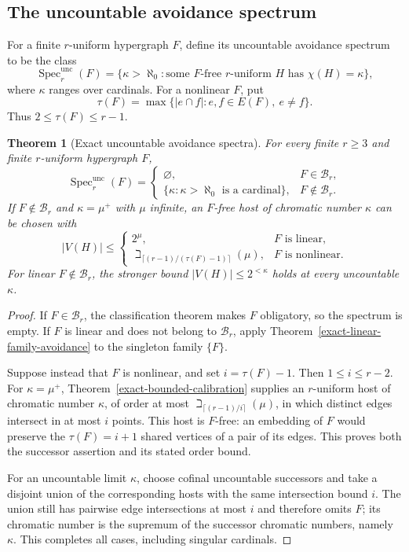 \documentclass[a4paper,11pt,reqno]{amsart}
\theoremstyle{plain}
\newtheorem{theorem}{Theorem}[section]
\theoremstyle{definition}
\theoremstyle{remark}
\begin{document}
\subsection{The uncountable avoidance spectrum}
\label{exact-spectrum-subsection}

For a finite $r$-uniform hypergraph $F$, define its uncountable
avoidance spectrum to be the class
\[
 \operatorname{Spec}^{\mathrm{unc}}_r(F)=
 \{\kappa>\aleph_0:
      \text{some $F$-free $r$-uniform $H$ has $\chi(H)=\kappa$}\},
\]
where $\kappa$ ranges over cardinals.
For a nonlinear $F$, put
\[
 \tau(F)=\max\{|e\cap f|:e,f\in E(F),\ e\ne f\}.
\]
Thus $2\le\tau(F)\le r-1$.

\begin{theorem}[Exact uncountable avoidance spectra]
\label{exact-avoidance-spectrum}
For every finite $r\ge3$ and finite $r$-uniform hypergraph $F$,
\[
 \operatorname{Spec}^{\mathrm{unc}}_r(F)=
 \begin{cases}
  \varnothing,&F\in\mathcal B_r,\\[2pt]
  \{\kappa:\kappa>\aleph_0\text{ is a cardinal}\},
       &F\notin\mathcal B_r.
 \end{cases}
\]
If $F\notin\mathcal B_r$ and $\kappa=\mu^+$ with $\mu$ infinite,
an $F$-free host of chromatic number $\kappa$ can be chosen with
\[
 |V(H)|\le
 \begin{cases}
  2^\mu,&F\text{ is linear},\\[2pt]
  \beth_{\lceil(r-1)/(\tau(F)-1)\rceil}(\mu),
       &F\text{ is nonlinear}.
 \end{cases}
\]
For linear $F\notin\mathcal B_r$, the stronger bound
$|V(H)|\le2^{<\kappa}$ holds at every uncountable $\kappa$.
\end{theorem}

\begin{proof}
If $F\in\mathcal B_r$, the classification theorem makes $F$
obligatory, so the spectrum is empty.
If $F$ is linear and does not belong to $\mathcal B_r$, apply
Theorem~\ref{exact-linear-family-avoidance} to the singleton family
$\{F\}$.

Suppose instead that $F$ is nonlinear, and set $i=\tau(F)-1$.
Then $1\le i\le r-2$.
For $\kappa=\mu^+$, Theorem~\ref{exact-bounded-calibration}
supplies an $r$-uniform host of chromatic number $\kappa$, of order
at most $\beth_{\lceil(r-1)/i\rceil}(\mu)$, in which distinct
edges intersect in at most $i$ points.
This host is $F$-free: an embedding of $F$ would preserve the
$\tau(F)=i+1$ shared vertices of a pair of its edges.
This proves both the successor assertion and its stated order bound.

For an uncountable limit $\kappa$, choose cofinal uncountable
successors and take a disjoint union of the corresponding hosts
with the same intersection bound $i$.
The union still has pairwise edge intersections at most $i$ and
therefore omits $F$; its chromatic number is the supremum of the
successor chromatic numbers, namely $\kappa$.
This completes all cases, including singular cardinals.
\end{proof}
\end{document}

